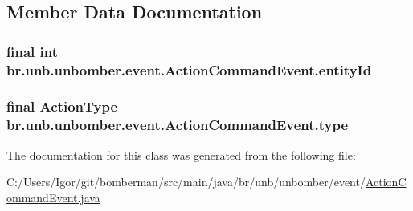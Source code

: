 \subsection{Member Data Documentation}
\hypertarget{classbr_1_1unb_1_1unbomber_1_1event_1_1_action_command_event_a4f6a8d5d706273c6cd4098179dc3a7e0}{
\subsubsection[{entity\+Id}]{\setlength{\rightskip}{0pt plus 5cm}final int br.\+unb.\+unbomber.\+event.\+Action\+Command\+Event.\+entity\+Id\hspace{0.3cm}{\ttfamily [private]}}}\label{classbr_1_1unb_1_1unbomber_1_1event_1_1_action_command_event_a4f6a8d5d706273c6cd4098179dc3a7e0}
\hypertarget{classbr_1_1unb_1_1unbomber_1_1event_1_1_action_command_event_ae3fcdcc187420aaf77783896fb74490c}{
\subsubsection[{type}]{\setlength{\rightskip}{0pt plus 5cm}final {\bf Action\+Type} br.\+unb.\+unbomber.\+event.\+Action\+Command\+Event.\+type\hspace{0.3cm}{\ttfamily [private]}}}\label{classbr_1_1unb_1_1unbomber_1_1event_1_1_action_command_event_ae3fcdcc187420aaf77783896fb74490c}


The documentation for this class was generated from the following file\+:\begin{DoxyCompactItemize}
\item 
C\+:/\+Users/\+Igor/git/bomberman/src/main/java/br/unb/unbomber/event/\hyperlink{_action_command_event_8java}{Action\+Command\+Event.\+java}\end{DoxyCompactItemize}
